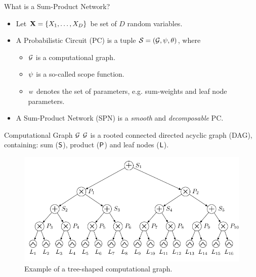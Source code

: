 \begin{frame}{What is a Sum-Product Network?}
\begin{itemize}
  \item Let $\mathbf{X} = \{X_1, \dots, X_D\}$ be set of $D$ random variables.
  \item A Probabilistic Circuit (PC) is a tuple $\mathcal{S} = (\mathcal{G}, \psi, \mathbf{\theta})$, where
  \begin{itemize}
    \item $\mathcal{G}$ is a computational graph.
    \item $\psi$ is a so-called scope function.
    \item $w$ denotes the set of parameters, e.g. sum-weights and leaf node parameters.
  \end{itemize}
  \item A Sum-Product Network (SPN) is a \emph{smooth} and \emph{decomposable} PC.
\end{itemize}
\end{frame}

\begin{frame}{Computational Graph $\mathcal{G}$}
 $\mathcal{G}$ is a rooted connected directed acyclic graph (DAG), containing: sum ($\mathsf{S}$), product ($\mathsf{P}$) and leaf nodes ($\mathsf{L}$).

\begin{figure}
  \includegraphics[width=\textwidth]{computation_graph}
  \caption{Example of a tree-shaped computational graph.}
\end{figure}
\end{frame}

